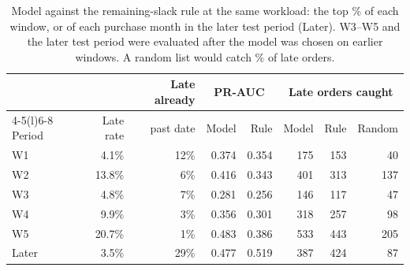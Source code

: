 \begin{table}[ht]
\centering\small
\caption{Model against the remaining-slack rule at the same workload: the top \ActShare{}\% of each window, or of each purchase month in the later test period (Later). W3--W5 and the later test period were evaluated after the model was chosen on earlier windows. A random list would catch \ActShare{}\% of late orders.}
\label{tab:period-value}
\begin{tabular}{@{}lrrrrrrr@{}}
\toprule
& & Late already & \multicolumn{2}{c}{PR-AUC} & \multicolumn{3}{c}{Late orders caught} \\
\cmidrule(lr){4-5}\cmidrule(l){6-8}
Period & Late rate & past date & Model & Rule & Model & Rule & Random \\
\midrule
W1 & 4.1\% & 12\% & 0.374 & 0.354 & 175 & 153 & 40 \\
W2 & 13.8\% & 6\% & 0.416 & 0.343 & 401 & 313 & 137 \\
W3 & 4.8\% & 7\% & 0.281 & 0.256 & 146 & 117 & 47 \\
W4 & 9.9\% & 3\% & 0.356 & 0.301 & 318 & 257 & 98 \\
W5 & 20.7\% & 1\% & 0.483 & 0.386 & 533 & 443 & 205 \\
Later & 3.5\% & 29\% & 0.477 & 0.519 & 387 & 424 & 87 \\
\bottomrule
\end{tabular}
\end{table}
